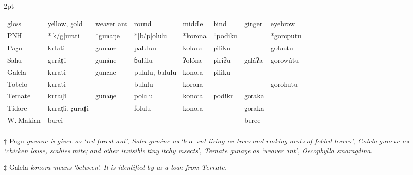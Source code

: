 \begin{table}[h]\centering{}
\begin{adjustbox}{width=\textwidth}
	\begin{threeparttable}\st{2pt}
	\begin{tabular}{l|lllllll}\lsptoprule
gloss	&	yellow, gold	&	weaver ant	&	round	&	middle	&	bind	&	ginger	&	eyebrow\\
PNH	&	*[k/g]urati	&	*gunaŋe\su{†}	&	*[b/p]olulu	&	*korona	&	*podiku	&		&	*goroputu\\	\midrule
Pagu	&	kulati	&	gunane	&	palulun	&	kolona	&	piliku	&		&	goloutu\\
Sahu	&	guráʧi	&	gunáne	&	ɓulúlu	&	ʔolóna	&	piríʔu	&	galáʔa	&	gorowútu\\
Galela	&	kurati	&	gunene	&	pululu, bululu	&	konora\su{‡}	&	piliku	&		&	\\
Tobelo	&	kurati	&		&	bululu	&	korona	&	\cg{(ʎikutu)}	&		&	gorohutu\\
Ternate	&	kuraʧi	&	gunaŋe	&	polulu	&	konora	&	podiku	&	goraka	&	\\
Tidore	&	kuraʧi, guraʧi	&		&	folulu	&	konora	&		&	goraka	&	\\
W. Makian	&	burei	&		&		&		&		&	buree	&	\\
		\lspbottomrule
	\end{tabular}
		\begin{tablenotes}\tnsize
			\item[†]	{Pagu \it{gunane} is given as `red forest ant',
								Sahu \it{gunáne} as `k.o.
								ant living on trees
								and making nests of folded leaves',
								Galela \it{gunene} as `chicken louse,
								scabies mite; and other invisible tiny itchy insects',
								Ternate \it{gunaŋe} as `weaver ant', \it{Oecophylla smaragdina}.}
			\item[‡]	{Galela \it{konora} means `between'.
								It is identified by \citet[215]{vanBaarda1895} as a loan from Ternate.}
		\end{tablenotes}
	\end{threeparttable}
\end{adjustbox}
\end{table}


